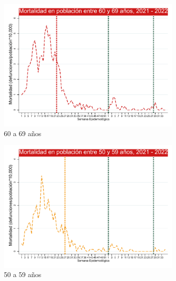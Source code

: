 \documentclass[xcolor=table]{beamer}
\begin{document}
\begin{frame}
\begin{figure}
		\hfill
		\begin{subfigure}[b]{0.3\textwidth}
			\centering
			\includegraphics[width=\textwidth]{../figuras/mortalidad_edad_60.pdf}
			\caption{60 a 69 años}
		\end{subfigure}
	\vspace{10mm}
		\begin{subfigure}[b]{0.3\textwidth}
		\centering
		\includegraphics[width=\textwidth]{../figuras/mortalidad_edad_50.pdf}
		\caption{50 a 59 años}
	\end{subfigure}
		\hfill
	\begin{subfigure}[b]{0.3\textwidth}
		\centering

\end{subfigure}
\end{figure}
\end{frame}
\end{document}
